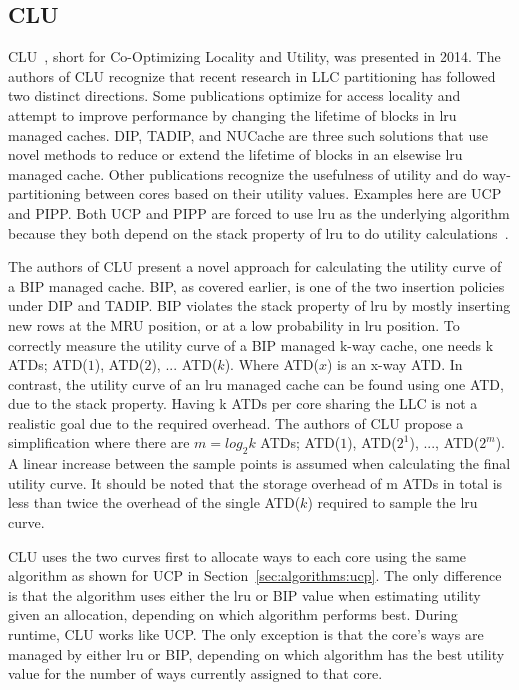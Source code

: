 
\subsection{CLU}
\label{sec:algorithms:clu}

CLU~\cite{Zhan2014}, short for Co-Optimizing Locality and Utility, was presented in 2014.
The authors of CLU recognize that recent research in LLC partitioning has followed two distinct directions.
Some publications optimize for access locality and attempt to improve performance by changing the lifetime of blocks in \gls{lru} managed caches.
DIP, TADIP, and NUCache are three such solutions that use novel methods to reduce or extend the lifetime of blocks in an elsewise \gls{lru} managed cache.
Other publications recognize the usefulness of utility and do way-partitioning between cores based on their utility values.
Examples here are UCP and PIPP.
Both UCP and PIPP are forced to use \gls{lru} as the underlying algorithm because they both depend on the stack property of \gls{lru} to do utility calculations~\cite{Qureshi2006, Xie2009}.

The authors of CLU present a novel approach for calculating the utility curve of a BIP managed cache.
BIP, as covered earlier, is one of the two insertion policies under DIP and TADIP. 
BIP violates the stack property of \gls{lru} by mostly inserting new rows at the MRU position, or at a low probability in \gls{lru} position.
To correctly measure the utility curve of a BIP managed k-way cache, one needs k ATDs; ATD($1$), ATD($2$), ... ATD($k$). 
Where ATD($x$) is an x-way ATD.
In contrast, the utility curve of an \gls{lru} managed cache can be found using one ATD, due to the stack property.
Having k ATDs per core sharing the LLC is not a realistic goal due to the required overhead.
The authors of CLU propose a simplification where there are $m = log_2 k$ ATDs; ATD($1$), ATD($2^1$), ..., ATD($2^m$).
A linear increase between the sample points is assumed when calculating the final utility curve.
It should be noted that the storage overhead of m ATDs in total is less than twice the overhead of the single ATD($k$) required to sample the \gls{lru} curve.

CLU uses the two curves first to allocate ways to each core using the same algorithm as shown for UCP in Section~\ref{sec:algorithms:ucp}.
The only difference is that the algorithm uses either the \gls{lru} or BIP value when estimating utility given an allocation, depending on which algorithm performs best.
During runtime, CLU works like UCP.
The only exception is that the core's ways are managed by either \gls{lru} or BIP, depending on which algorithm has the best utility value for the number of ways currently assigned to that core.

